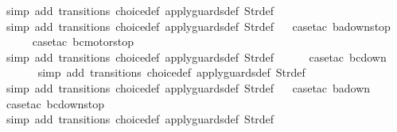 \begin{isabellebody}
\ {\isacharparenleft}simp\ add{\isacharcolon}\ transitions\ choice{\isacharunderscore}def\ apply{\isacharunderscore}guards{\isacharunderscore}def\ Str{\isacharunderscore}def{\isacharparenright}\isanewline
\ \ \ \ \isamarkupfalse%
\ {\isacharparenleft}simp\ add{\isacharcolon}\ transitions\ choice{\isacharunderscore}def\ apply{\isacharunderscore}guards{\isacharunderscore}def\ Str{\isacharunderscore}def{\isacharparenright}\isanewline
\ \isamarkupfalse%
\ {\isacharparenleft}case{\isacharunderscore}tac\ {\isachardoublequoteopen}ba{\isacharequal}down{}{}stop{\isachardoublequoteclose}{\isacharparenright}\isanewline
\ \ \ \ \isamarkupfalse%
\ {\isacharparenleft}case{\isacharunderscore}tac\ {\isachardoublequoteopen}bc{\isacharequal}motorstop{}{\isachardoublequoteclose}{\isacharparenright}\isanewline
\ \ \ \ \ \isamarkupfalse%
\ {\isacharparenleft}simp\ add{\isacharcolon}\ transitions\ choice{\isacharunderscore}def\ apply{\isacharunderscore}guards{\isacharunderscore}def\ Str{\isacharunderscore}def{\isacharparenright}\isanewline
\ \ \ \ \isamarkupfalse%
\ {\isacharparenleft}case{\isacharunderscore}tac\ {\isachardoublequoteopen}bc{\isacharequal}down{}{}{\isachardoublequoteclose}{\isacharparenright}\isanewline
\ \ \ \ \ \isamarkupfalse%
\ {\isacharparenleft}simp\ add{\isacharcolon}\ transitions\ choice{\isacharunderscore}def\ apply{\isacharunderscore}guards{\isacharunderscore}def\ Str{\isacharunderscore}def{\isacharparenright}\isanewline
\ \ \isamarkupfalse%
\ {\isacharparenleft}simp\ add{\isacharcolon}\ transitions\ choice{\isacharunderscore}def\ apply{\isacharunderscore}guards{\isacharunderscore}def\ Str{\isacharunderscore}def{\isacharparenright}\isanewline
\ \isamarkupfalse%
\ {\isacharparenleft}case{\isacharunderscore}tac\ {\isachardoublequoteopen}ba{\isacharequal}down{}{}{\isachardoublequoteclose}{\isacharparenright}\isanewline
\ \ \ \ \isamarkupfalse%
\ {\isacharparenleft}case{\isacharunderscore}tac\ {\isachardoublequoteopen}bc{\isacharequal}down{}{}stop{\isachardoublequoteclose}{\isacharparenright}\isanewline
\ \ \ \ \ \isamarkupfalse%
\ {\isacharparenleft}simp\ add{\isacharcolon}\ transitions\ choice{\isacharunderscore}def\ apply{\isacharunderscore}guards{\isacharunderscore}def\ Str{\isacharunderscore}def{\isacharparenright}\isanewline
\ \ \ \ \isamarkupfalse%

\end{isabellebody}
